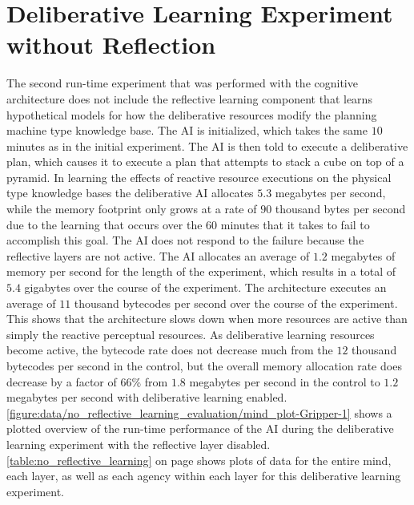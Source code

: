 \section{Deliberative Learning Experiment without Reflection}

The second run-time experiment that was performed with the cognitive
architecture does not include the reflective learning component that
learns hypothetical models for how the deliberative resources modify
the planning machine type knowledge base.  The AI is initialized,
which takes the same $10$ minutes as in the initial experiment.  The
AI is then told to execute a deliberative plan, which causes it to
execute a plan that attempts to stack a cube on top of a pyramid.  In
learning the effects of reactive resource executions on the physical
type knowledge bases the deliberative AI allocates $5.3$ megabytes per
second, while the memory footprint only grows at a rate of $90$
thousand bytes per second due to the learning that occurs over the
$60$ minutes that it takes to fail to accomplish this goal.  The AI
does not respond to the failure because the reflective layers are not
active.  The AI allocates an average of $1.2$ megabytes of memory per
second for the length of the experiment, which results in a total of
$5.4$ gigabytes over the course of the experiment.  The architecture
executes an average of $11$ thousand bytecodes per second over the
course of the experiment.  This shows that the architecture slows down
when more resources are active than simply the reactive perceptual
resources.  As deliberative learning resources become active, the
bytecode rate does not decrease much from the $12$ thousand bytecodes
per second in the control, but the overall memory allocation rate does
decrease by a factor of $66$\% from $1.8$ megabytes per second in the
control to $1.2$ megabytes per second with deliberative learning
enabled.
{\mbox{\autoref{figure:data/no_reflective_learning_evaluation/mind_plot-Gripper-1}}}
shows a plotted overview of the run-time performance of the AI during
the deliberative learning experiment with the reflective layer
disabled.  \autoref{table:no_reflective_learning} on page
\pageref{table:no_reflective_learning} shows plots of data for the
entire mind, each layer, as well as each agency within each layer for
this deliberative learning experiment.

